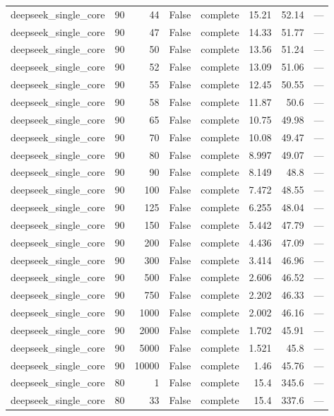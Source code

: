 \begin{tabular}{lrrrlrrl}
deepseek\_single\_core & 90 & 44 & False & complete & 15.21 & 52.14 & — \\
deepseek\_single\_core & 90 & 47 & False & complete & 14.33 & 51.77 & — \\
deepseek\_single\_core & 90 & 50 & False & complete & 13.56 & 51.24 & — \\
deepseek\_single\_core & 90 & 52 & False & complete & 13.09 & 51.06 & — \\
deepseek\_single\_core & 90 & 55 & False & complete & 12.45 & 50.55 & — \\
deepseek\_single\_core & 90 & 58 & False & complete & 11.87 & 50.6 & — \\
deepseek\_single\_core & 90 & 65 & False & complete & 10.75 & 49.98 & — \\
deepseek\_single\_core & 90 & 70 & False & complete & 10.08 & 49.47 & — \\
deepseek\_single\_core & 90 & 80 & False & complete & 8.997 & 49.07 & — \\
deepseek\_single\_core & 90 & 90 & False & complete & 8.149 & 48.8 & — \\
deepseek\_single\_core & 90 & 100 & False & complete & 7.472 & 48.55 & — \\
deepseek\_single\_core & 90 & 125 & False & complete & 6.255 & 48.04 & — \\
deepseek\_single\_core & 90 & 150 & False & complete & 5.442 & 47.79 & — \\
deepseek\_single\_core & 90 & 200 & False & complete & 4.436 & 47.09 & — \\
deepseek\_single\_core & 90 & 300 & False & complete & 3.414 & 46.96 & — \\
deepseek\_single\_core & 90 & 500 & False & complete & 2.606 & 46.52 & — \\
deepseek\_single\_core & 90 & 750 & False & complete & 2.202 & 46.33 & — \\
deepseek\_single\_core & 90 & 1000 & False & complete & 2.002 & 46.16 & — \\
deepseek\_single\_core & 90 & 2000 & False & complete & 1.702 & 45.91 & — \\
deepseek\_single\_core & 90 & 5000 & False & complete & 1.521 & 45.8 & — \\
deepseek\_single\_core & 90 & 10000 & False & complete & 1.46 & 45.76 & — \\
deepseek\_single\_core & 80 & 1 & False & complete & 15.4 & 345.6 & — \\
deepseek\_single\_core & 80 & 33 & False & complete & 15.4 & 337.6 & — \\

\end{tabular}
